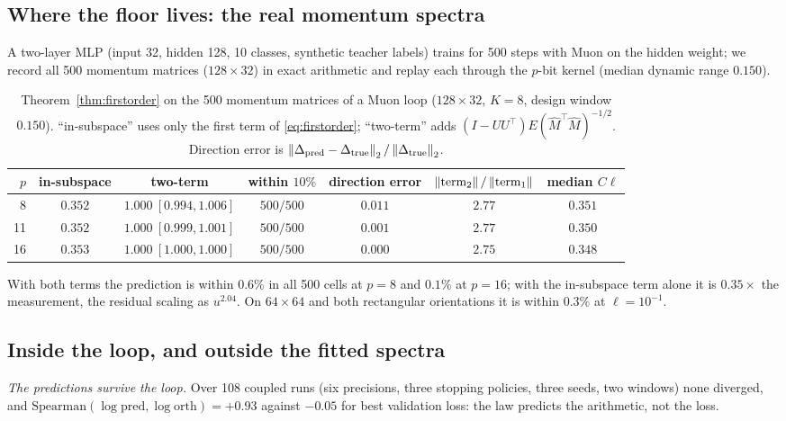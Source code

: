 \subsection{Where the floor lives: the real momentum spectra}
\label{sec:realmomentum}

A two-layer MLP (input 32, hidden 128, 10 classes, synthetic teacher labels) trains for
500 steps with Muon on the hidden weight; we record all 500
momentum matrices ($128\times32$) in exact arithmetic and replay each through the $p$-bit
kernel (median dynamic range $0.150$).

\begin{table}[t]
\centering
\caption{Theorem~\ref{thm:firstorder} on the 500 momentum matrices of a Muon loop
($128\times32$, $K=8$, design window $0.150$).  ``in-subspace'' uses only the first
term of \eqref{eq:firstorder}; ``two-term'' adds
$(I-UU^\top)E(\hat M^\top\hat M)^{-1/2}$.  Direction error is
$\left\lVert \Delta_{\mathrm{pred}}-\Delta_{\mathrm{true}} \right\rVert_2/\left\lVert \Delta_{\mathrm{true}} \right\rVert_2$.}
\label{tab:real500}
\begin{tabular}{rcccccc}
\toprule
$p$ & in-subspace & two-term & within $10\%$ & direction error & $\left\lVert \text{term}_2 \right\rVert/\left\lVert \text{term}_1 \right\rVert$ & median $C\ell$ \\
\midrule
8  & $0.352$ & $1.000\ [0.994,1.006]$ & $500/500$ & $0.011$ & $2.77$ & $0.351$ \\
11 & $0.352$ & $1.000\ [0.999,1.001]$ & $500/500$ & $0.001$ & $2.77$ & $0.350$ \\
16 & $0.353$ & $1.000\ [1.000,1.000]$ & $500/500$ & $0.000$ & $2.75$ & $0.348$ \\
\bottomrule
\end{tabular}
\end{table}

With both terms the prediction is within $0.6\%$ in all 500 cells at $p=8$ and $0.1\%$ at
$p=16$; with the in-subspace term alone it is $0.35\times$ the measurement, the residual
scaling as $u^{2.04}$.  On $64\times64$ and both rectangular orientations it is within
$0.3\%$ at $\ell=10^{-1}$.

\subsection{Inside the loop, and outside the fitted spectra}
\label{sec:loop}

\emph{The predictions survive the loop.}  Over 108 coupled runs (six precisions, three
stopping policies, three seeds, two windows) none diverged, and
$\mathrm{Spearman}(\log\text{pred},\log\text{orth}) = +0.93$ against $-0.05$ for best
validation loss: the law predicts the arithmetic, not the loss.

